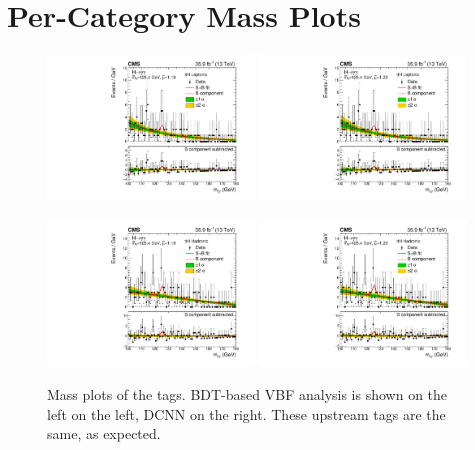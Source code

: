 
\chapter{Per-Category Mass Plots}
\label{appendix:mass_plots}

\begin{figure}[h!]
    \begin{center}
        \includegraphics[width=0.49\textwidth]{figures/appendix_mass_plots/CMS-HIG-16-040_Figure_012-d.pdf}
        \includegraphics[width=0.49\textwidth]{figures/appendix_mass_plots/SBplots_jackWSnewTTHLeptonicTag_13TeV.pdf}
    \end{center}
    \begin{center}
        \includegraphics[width=0.49\textwidth]{figures/appendix_mass_plots/CMS-HIG-16-040_Figure_012-e.pdf}
        \includegraphics[width=0.49\textwidth]{figures/appendix_mass_plots/SBplots_jackWSnewTTHHadronicTag_13TeV.pdf}
    \end{center}
    \label{fig:app_mass_plots:tth}
    \caption{Mass plots of the \ttH tags. BDT-based VBF analysis is shown on the left on the left, DCNN on the right. These upstream tags are the same, as expected.}
\end{figure}


